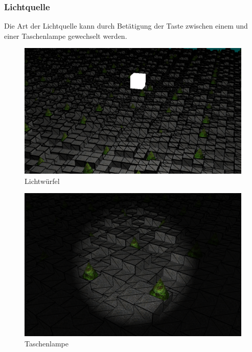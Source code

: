 \documentclass{article}
\begin{document}
\subsubsection{Lichtquelle}
Die Art der Lichtquelle kann durch Betätigung der Taste  zwischen einem  und einer
Taschenlampe gewechselt werden.\\
\begin{minipage}{0.55\textwidth}
\begin{figure}[H]
    \includegraphics[scale=0.258]{lmode1.png}
    \caption{Lichtwürfel}
\end{figure}
\end{minipage}
\begin{minipage}{0.45\textwidth}
\begin{figure}[H]
    \includegraphics[scale=0.145]{lmode2.png}
    \caption{Taschenlampe}
\end{figure}
\end{minipage}
\end{document}
